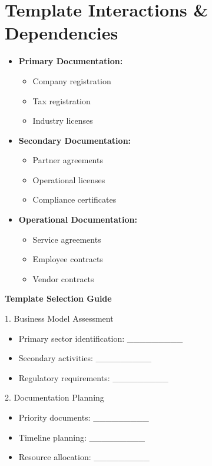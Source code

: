 \section{Template Interactions \& Dependencies}

\begin{tcolorbox}[colback=white,colframe=primarydark,title=\textbf{Documentation Flow Chart}]
\begin{itemize}
    \item \textbf{Primary Documentation:}
    \begin{itemize}
        \item Company registration
        \item Tax registration
        \item Industry licenses
    \end{itemize}

    \item \textbf{Secondary Documentation:}
    \begin{itemize}
        \item Partner agreements
        \item Operational licenses
        \item Compliance certificates
    \end{itemize}

    \item \textbf{Operational Documentation:}
    \begin{itemize}
        \item Service agreements
        \item Employee contracts
        \item Vendor contracts
    \end{itemize}
\end{itemize}
\end{tcolorbox}

\begin{workshopbox}
\textbf{Template Selection Guide}

1. Business Model Assessment
\begin{itemize}
    \item Primary sector identification: \_\_\_\_\_\_\_\_\_
    \item Secondary activities: \_\_\_\_\_\_\_\_\_
    \item Regulatory requirements: \_\_\_\_\_\_\_\_\_
\end{itemize}

2. Documentation Planning
\begin{itemize}
    \item Priority documents: \_\_\_\_\_\_\_\_\_
    \item Timeline planning: \_\_\_\_\_\_\_\_\_
    \item Resource allocation: \_\_\_\_\_\_\_\_\_
\end{itemize}
\end{workshopbox}


